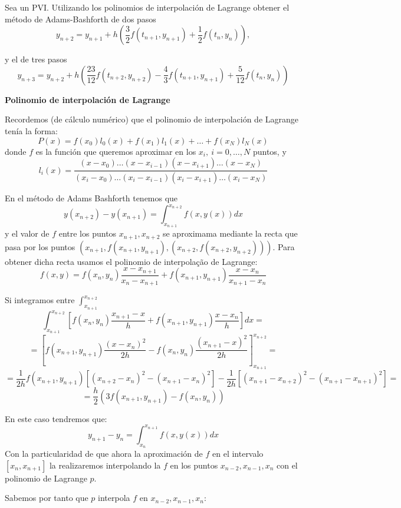 \begin{problem}[6]
	\ppart Sea un PVI. Utilizando los polinomios de interpolación de Lagrange obtener el método de Adams-Bashforth de dos pasos
	\[y_{n+2} = y_{n+1} + h \left( \frac{3}{2}f(t_{n+1}, y_{n+1}) + \frac{1}{2}f(t_n,y_n) \right),\]
	
	\ppart y el de tres pasos
	\[y_{n+3} = y_{n+2} + h \left( \frac{23}{12} f(t_{n+2},y_{n+2}) - \frac{4}{3} f(t_{n+1}, y_{n+1}) + \frac{5}{12}f(t_n,y_n) \right)\]
	
	\solution
	\begin{defn}{\textbf{Polinomio de interpolación de Lagrange}}

		Recordemos (de cálculo numérico) que el polinomio de interpolación de Lagrange tenía la forma:
		\[P(x) = f(x_0)l_0(x) + f(x_1)l_1(x) + … + f(x_N)l_N(x)\]
		donde $f$ es la función que queremos aproximar en los $x_i,\ i=0,…,N$ puntos, y
		\[l_i(x) = \frac{(x-x_0) … (x-x_{i-1}) (x-x_{i+1}) … (x-x_N)}{(x_i-x_0) … (x_i-x_{i-1}) (x_i-x_{i+1}) … (x_i-x_N)}\]
	\end{defn}

	\spart
	En el método de Adams Bashforth tenemos que
	\[y(x_{n+2})-y(x_{n+1}) = \int_{x_{n+1}}^{x_{n+2}} f(x,y(x)) dx\]
	y el valor de $f$ entre los puntos $x_{n+1}, x_{n+2}$ se aproximama mediante la recta que pasa por los puntos $(x_{n+1},f(x_{n+1},y_{n+1}), (x_{n+2}, f(x_{n+2},y_{n+2})))$. Para obtener dicha recta usamos el polinomio de interpolação de Lagrange:
	\[f(x,y) = f(x_n,y_n)\frac{x-x_{n+1}}{x_n-x_{n+1}} + f(x_{n+1},y_{n+1}) \frac{x-x_n}{x_{n+1}-x_n}\]

	Si integramos entre $\int_{x_{n+1}}^{x_{n+2}}$
	\[\int_{x_{n+1}}^{x_{n+2}} \left[ f(x_n,y_n)\frac{x_{n+1}-x}{h} + f(x_{n+1},y_{n+1})\frac{x-x_n}{h} \right]dx =\]
	\[= \left[ f(x_{n+1},y_{n+1}) \frac{(x-x_n)^2}{2h} - f(x_n,y_n)\frac{(x_{n+1}-x)^2}{2h} \right]_{x_{n+1}}^{x_{n+2}}  =\]
	\[= \frac{1}{2h}f(x_{n+1},y_{n+1}) \left[ (x_{n+2}-x_n)^2 - (x_{n+1}-x_n)^2 \right] - \frac{1}{2h} \left[ (x_{n+1} - x_{n+2})^2 - (x_{n+1} - x_{n+1})^2 \right] =\]
	\[= \frac{h}{2} \left( 3f(x_{n+1},y_{n+1}) - f(x_n,y_n) \right)\]


	\spart
	En este caso tendremos que:
	\[y_{n+1} - y_n = \int_{x_n}^{x_{n+1}} f(x,y(x)) dx\]
	Con la particularidad de que ahora la aproximación de $f$ en el intervalo $[x_n,x_{n+1}]$ la realizaremos interpolando la $f$ en los puntos $x_{n-2},x_{n-1},x_n$ con el polinomio de Lagrange $p$.

	Sabemos por tanto que $p$ interpola $f$ en $x_{n-2},x_{n-1},x_n$:


\end{problem}
